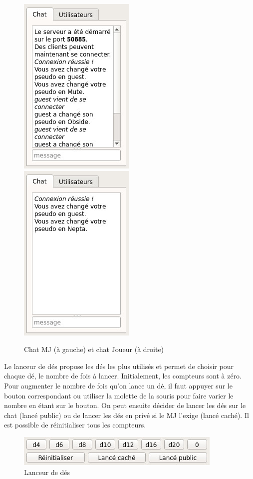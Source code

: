 \begin{figure}[h!]
	\centering
	\includegraphics[scale=0.5]{img/chat_mj.jpg}
	\hspace{10 mm}
	\includegraphics[scale=0.5]{img/chat_player.jpg}
	\caption{Chat MJ (à gauche) et chat Joueur (à droite)}
\end{figure}

Le lanceur de dés propose les dés les plus utilisés et permet de choisir pour chaque dé, le nombre de fois à lancer. Initialement, les compteurs sont à zéro. Pour augmenter le nombre de fois qu'on lance un dé, il faut appuyer sur le bouton correspondant ou utiliser la molette de la souris pour faire varier le nombre en étant sur le bouton. On peut ensuite décider de lancer les dés sur le chat (lancé public) ou de lancer les dés en privé si le MJ l'exige (lancé caché). Il est possible de réinitialiser tous les compteurs.

\begin{figure}[h!]
	\centering
	\includegraphics[scale=0.5]{img/dice_manager.jpg}
	\caption{Lanceur de dés}
\end{figure}

